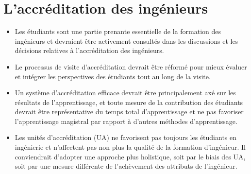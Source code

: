 \section{L'accréditation des ingénieurs}\label{laccreditation-des-ingenieurs}



\begin{itemize}
 \item Les étudiants sont une partie prenante essentielle de la formation des ingénieurs et devraient être activement consultés dans les discussions et les décisions relatives à l'accréditation des ingénieurs.
 \item Le processus de visite d'accréditation devrait être réformé pour mieux évaluer et intégrer les perspectives des étudiants tout au long de la visite.
 \item Un système d'accréditation efficace devrait être principalement axé sur les résultats de l'apprentissage, et toute mesure de la contribution des étudiants devrait être représentative du temps total d'apprentissage et ne pas favoriser l'apprentissage magistral par rapport à d'autres méthodes d'apprentissage.
 \item Les unités d'accréditation (UA) ne favorisent pas toujours les étudiants en ingénierie et n'affectent pas non plus la qualité de la formation d'ingénieur. Il conviendrait d'adopter une approche plus holistique, soit par le biais des UA, soit par une mesure différente de l'achèvement des attributs de l'ingénieur.
\end{itemize}

